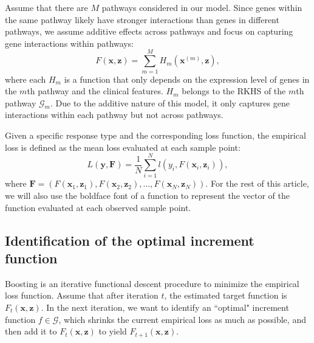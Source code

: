 \documentclass[a4paper,12pt]{article}
\newcommand{\bd}[1]{\mathbf{#1}}
\begin{document}
	Assume that there are $M$ pathways considered in our model. Since genes within the same pathway likely have stronger interactions than genes in different pathways, we assume additive effects across pathways and focus on capturing gene interactions within pathways:
	\begin{equation*}
	F(\bd{x}, \bd{z}) = \sum_{m=1}^M H_m(\bd{x}^{(m)}, \bd{z}),
	\end{equation*}
	where each $H_m$ is a function that only depends on the expression level of genes in the $m$th pathway and the clinical features. $H_m$ belongs to the RKHS of the $m$th pathway $\mathcal{G}_m $. Due to the additive nature of this model, it only captures gene interactions within each pathway but not across pathways. 
	
	Given a specific response type and the corresponding loss function, the empirical loss is defined as the mean loss evaluated at each sample point:
	$$L(\bd{y},\bd{F}) = \frac{1}{N} \sum_{i=1}^N l(y_i,F(\bd{x}_i,\bd{z}_i)),$$
	where $\bd{F} = (F(\bd{x}_1, \bd{z}_1), F(\bd{x}_2, \bd{z}_2), \ldots, F(\bd{x}_N, \bd{z}_N))$. For the rest of this article, we will also use the boldface font of a function to represent the vector of the function evaluated at each observed sample point.
	
	\subsection{Identification of the optimal increment function } \label{sec:identify}
	Boosting is an iterative functional descent procedure to minimize the empirical loss function. Assume that after iteration $t$, the estimated target function is $F_t(\bd{x}, \bd{z})$. In the next iteration, we want to identify an ``optimal" increment function $f \in \mathcal{G}$, which shrinks the current empirical loss as much as possible, and then add it to $F_t(\bd{x}, \bd{z})$ to yield $F_{t+1}(\bd{x}, \bd{z})$. 
	
\end{document}
